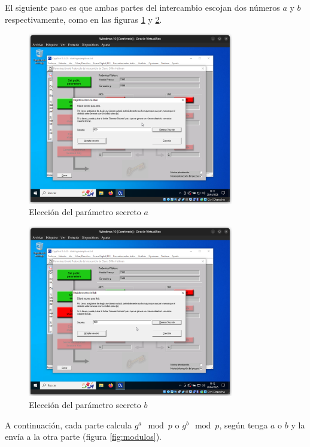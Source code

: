 El siguiente paso es que ambas partes del intercambio escojan dos números $a$ y $b$ respectivamente, como en las figuras \ref{fig:aparam} y \ref{fig:bparam}.

\begin{figure}[H]
    \centering
    \includegraphics[width=0.8\textwidth]{D&H-3.png}
    \caption{Elección del parámetro secreto $a$}
    \label{fig:aparam}
\end{figure}

\begin{figure}[H]
    \centering
    \includegraphics[width=0.8\textwidth]{D&H-4.png}
    \caption{Elección del parámetro secreto $b$}
    \label{fig:bparam}
\end{figure}

A continuación, cada parte calcula $g^a\mod{p}$ o $g^b\mod{p}$, según tenga $a$ o $b$ y la envía a la otra parte (figura \ref{fig:modulos}).

